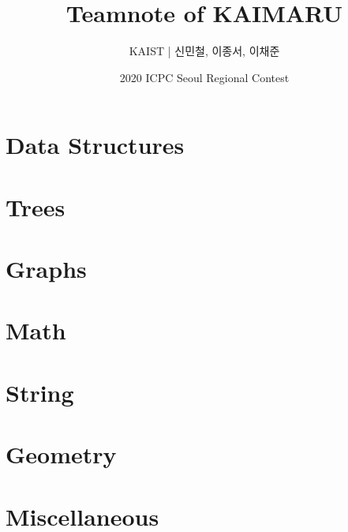 \documentclass[10pt,landscape,a4paper]{article}
\title{ \bf \sf \fontsize{80}{80}\selectfont Teamnote of KAIMARU}
\author{\sf \huge KAIST | 신민철, 이종서, 이채준}
\date{\sf \Large 2020 ICPC Seoul Regional Contest}
\newenvironment{cpp}
  {\VerbatimEnvironment
   \begin{verbatim}}
  {\end{verbatim}}
\begin{document}
\begin{multicols}{2}



\maketitle


\section{Data Structures}


\section{Trees}


\section{Graphs}


\section{Math}


\section{String}


\section{Geometry}


\section{Miscellaneous}

\iffalse
\subsection{References}
\begin{cpp}
/*
https://github.com/koosaga/olympiad/tree/master/Library
https://github.com/jh05013/icpc-teamnote/blob/master/main.tex //template
https://github.com/hongjun7/Competitive-Programming/blob/master/
https://github.com/ntopia/icpc-teamnote/tree/master/src
https://github.com/justiceHui/AlgorithmImplement/
https://github.com/kth-competitive-programming/kactl
https://zigui.tistory.com/
https://cp-algorithms.com/dynamic_programming/divide-and-conquer-dp.html
*/
\end{cpp}
\fi
\end{multicols}
\end{document}

